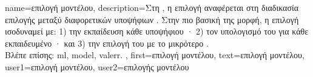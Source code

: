 {name={\foreignlanguage{greek}{επιλογή μοντέλου}},
	description={\foreignlanguage{greek}{Στη} , 
		\foreignlanguage{greek}{η επιλογή}  \foreignlanguage{greek}{αναφέρεται στη διαδικασία 
		επιλογής μεταξύ διαφορετικών υποψήφιων} . \foreignlanguage{greek}{Στην πιο βασική 
		της μορφή, η επιλογή}  \foreignlanguage{greek}{ισοδυναμεί με: 1) την εκπαίδευση 
		κάθε υποψήφιου} · 2) \foreignlanguage{greek}{τον υπολογισμό του}  
		\foreignlanguage{greek}{για κάθε εκπαιδευμένο} · \foreignlanguage{greek}{και 3) την 
		επιλογή του}  \foreignlanguage{greek}{με το μικρότερο}  
		\cite[\foreignlanguage{greek}{Κεφ.} 6]{MLBasics}.\\
		\foreignlanguage{greek}{Βλέπε επίσης:} \gls{ml}, \gls{model}, \gls{valerr}. },
	first={\foreignlanguage{greek}{επιλογή μοντέλου}},
	text={\foreignlanguage{greek}{επιλογή μοντέλου}},
	user1={\foreignlanguage{greek}{επιλογή μοντέλου}}, %
	user2={\foreignlanguage{greek}{επιλογής μοντέλου}} %
}

